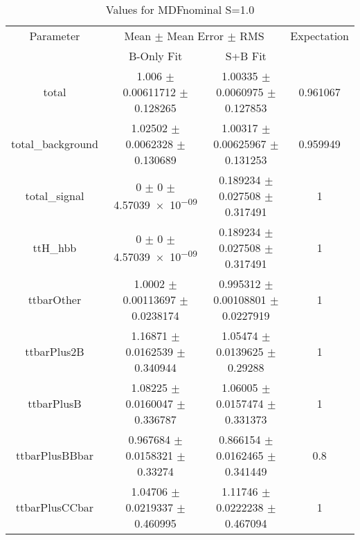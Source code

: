 \begin{table}
\centering
\caption{Values for MDFnominal S=1.0}
\begin{tabular}{cccc}
\toprule
Parameter & \multicolumn{2}{c}{Mean $\pm$ Mean Error $\pm$ RMS} & Expectation\\
 & B-Only Fit & S+B Fit & \\
\midrule
total & \num{1.006} $\pm$ \num{0.00611712} $\pm$ \num{0.128265} & \num{1.00335} $\pm$ \num{0.0060975} $\pm$ \num{0.127853} & \num{0.961067}\\
total\_background & \num{1.02502} $\pm$ \num{0.0062328} $\pm$ \num{0.130689} & \num{1.00317} $\pm$ \num{0.00625967} $\pm$ \num{0.131253} & \num{0.959949}\\
total\_signal & \num{0} $\pm$ \num{0} $\pm$ \num{4.57039e-09} & \num{0.189234} $\pm$ \num{0.027508} $\pm$ \num{0.317491} & \num{1}\\
ttH\_hbb & \num{0} $\pm$ \num{0} $\pm$ \num{4.57039e-09} & \num{0.189234} $\pm$ \num{0.027508} $\pm$ \num{0.317491} & \num{1}\\
ttbarOther & \num{1.0002} $\pm$ \num{0.00113697} $\pm$ \num{0.0238174} & \num{0.995312} $\pm$ \num{0.00108801} $\pm$ \num{0.0227919} & \num{1}\\
ttbarPlus2B & \num{1.16871} $\pm$ \num{0.0162539} $\pm$ \num{0.340944} & \num{1.05474} $\pm$ \num{0.0139625} $\pm$ \num{0.29288} & \num{1}\\
ttbarPlusB & \num{1.08225} $\pm$ \num{0.0160047} $\pm$ \num{0.336787} & \num{1.06005} $\pm$ \num{0.0157474} $\pm$ \num{0.331373} & \num{1}\\
ttbarPlusBBbar & \num{0.967684} $\pm$ \num{0.0158321} $\pm$ \num{0.33274} & \num{0.866154} $\pm$ \num{0.0162465} $\pm$ \num{0.341449} & \num{0.8}\\
ttbarPlusCCbar & \num{1.04706} $\pm$ \num{0.0219337} $\pm$ \num{0.460995} & \num{1.11746} $\pm$ \num{0.0222238} $\pm$ \num{0.467094} & \num{1}\\
\bottomrule
\end{tabular}
\end{table}